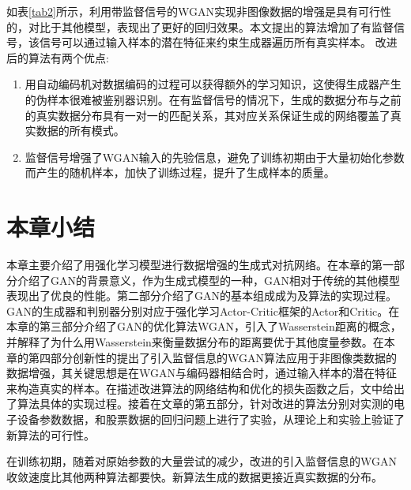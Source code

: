 如表\ref{tab2}所示，利用带监督信号的WGAN实现非图像数据的增强是具有可行性的，对比于其他模型，表现出了更好的回归效果。本文提出的算法增加了有监督信号，该信号可以通过输入样本的潜在特征来约束生成器遍历所有真实样本。
改进后的算法有两个优点:
\begin{enumerate}
	\item 用自动编码机对数据编码的过程可以获得额外的学习知识，这使得生成器产生的伪样本很难被鉴别器识别。在有监督信号的情况下，生成的数据分布与之前的真实数据分布具有一对一的匹配关系，其对应关系保证生成的网络覆盖了真实数据的所有模式。
	\item 监督信号增强了WGAN输入的先验信息，避免了训练初期由于大量初始化参数而产生的随机样本，加快了训练过程，提升了生成样本的质量。
\end{enumerate}

\section{本章小结}

本章主要介绍了用强化学习模型进行数据增强的生成式对抗网络。在本章的第一部分介绍了GAN的背景意义，作为生成式模型的一种，GAN相对于传统的其他模型表现出了优良的性能。第二部分介绍了GAN的基本组成成为及算法的实现过程。GAN的生成器和判别器分别对应于强化学习Actor-Critic框架的Actor和Critic。在本章的第三部分介绍了GAN的优化算法WGAN，引入了Wasserstein距离的概念，并解释了为什么用Wasserstein来衡量数据分布的距离要优于其他度量参数。在本章的第四部分创新性的提出了引入监督信息的WGAN算法应用于非图像类数据的数据增强，其关键思想是在WGAN与编码器相结合时，通过输入样本的潜在特征来构造真实的样本。在描述改进算法的网络结构和优化的损失函数之后，文中给出了算法具体的实现过程。接着在文章的第五部分，针对改进的算法分别对实测的电子设备参数数据，和股票数据的回归问题上进行了实验，从理论上和实验上验证了新算法的可行性。

在训练初期，随着对原始参数的大量尝试的减少，改进的引入监督信息的WGAN收敛速度比其他两种算法都要快。新算法生成的数据更接近真实数据的分布。